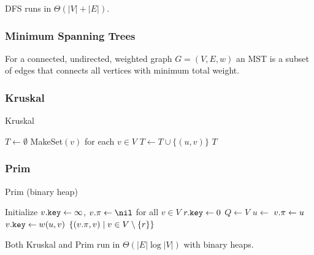 DFS runs in $\Theta(|V|+|E|)$.

\subsubsection{Minimum Spanning Trees}

For a connected, undirected, weighted graph \(G=(V,E,w)\) an MST is a subset
of edges that connects all vertices with minimum total weight.

\subsubsection{Kruskal}

\begin{algorithm}[H]
\caption{Kruskal}\label{alg:kruskal}
\begin{algorithmic}[1]
  \State $T\gets\emptyset$
  \State MakeSet$(v)$ for each $v\in V$
      \State $T\gets T\cup\{(u,v)\}$
      \State {}
    \EndIf
  \EndFor
  \State \Return $T$
\EndFunction
\end{algorithmic}
\end{algorithm}

\subsubsection{Prim}

\begin{algorithm}[H]
\caption{Prim (binary heap)}\label{alg:prim}
\begin{algorithmic}[1]
  \State Initialize $v\mathtt{.}\mathtt{key}\gets\infty$, $\attrib{v}{\pi}\gets\nil$ for all $v\in V$
  \State $r\mathtt{.}\mathtt{key}\gets 0$
  \State $Q\gets V$  
    \State $u\gets$ 
        \State $v\mathtt{.}\mathtt{\pi}\gets u$
        \State $v\mathtt{.}\mathtt{key}\gets w(u,v)$
        \State {}
      \EndIf
    \EndFor
  \EndWhile
  \State \Return $\{(v\mathtt{.}\mathtt{\pi},v)\mid v\in V\setminus\{r\}\}$
\EndFunction
\end{algorithmic}
\end{algorithm}

Both Kruskal and Prim run in $\Theta(|E|\log|V|)$ with binary heaps.

